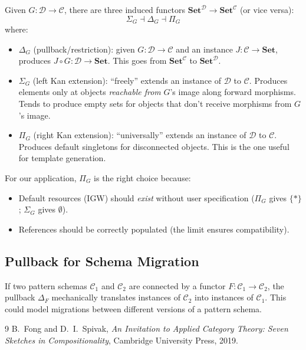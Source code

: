 \documentclass[11pt,a4paper]{article}
\theoremstyle{definition}
\theoremstyle{plain}
\newcommand{\Set}{\mathbf{Set}}
\begin{document}
Given $G \colon \mathcal{D} \to \mathcal{C}$, there are three induced functors $\Set^{\mathcal{D}} \to \Set^{\mathcal{C}}$ (or vice versa):
\[
\Sigma_G \dashv \Delta_G \dashv \Pi_G
\]
where:
\begin{itemize}
  \item $\Delta_G$ (pullback/restriction): given $G \colon \mathcal{D} \to \mathcal{C}$ and an instance $J \colon \mathcal{C} \to \Set$, produces $J \circ G \colon \mathcal{D} \to \Set$. This goes from $\Set^{\mathcal{C}}$ to $\Set^{\mathcal{D}}$.
  \item $\Sigma_G$ (left Kan extension): ``freely'' extends an instance of $\mathcal{D}$ to $\mathcal{C}$. Produces elements only at objects \emph{reachable from} $G$'s image along forward morphisms. Tends to produce empty sets for objects that don't receive morphisms from $G$'s image.
  \item $\Pi_G$ (right Kan extension): ``universally'' extends an instance of $\mathcal{D}$ to $\mathcal{C}$. Produces default singletons for disconnected objects. This is the one useful for template generation.
\end{itemize}

For our application, $\Pi_G$ is the right choice because:
\begin{itemize}
  \item Default resources (IGW) should \emph{exist} without user specification ($\Pi_G$ gives $\{*\}$; $\Sigma_G$ gives $\emptyset$).
  \item References should be correctly populated (the limit ensures compatibility).
\end{itemize}

\subsection{Pullback for Schema Migration}

If two pattern schemas $\mathcal{C}_1$ and $\mathcal{C}_2$ are connected by a functor $F \colon \mathcal{C}_1 \to \mathcal{C}_2$, the pullback $\Delta_F$ mechanically translates instances of $\mathcal{C}_2$ into instances of $\mathcal{C}_1$. This could model migrations between different versions of a pattern schema.

\begin{thebibliography}{9}
B.~Fong and D.~I.~Spivak, \emph{An Invitation to Applied Category Theory: Seven Sketches in Compositionality}, Cambridge University Press, 2019.
\end{thebibliography}
\end{document}
